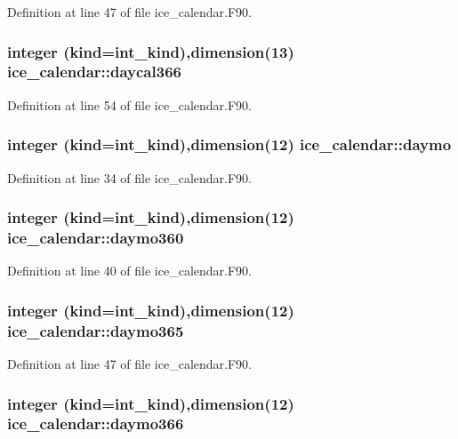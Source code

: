 Definition at line 47 of file ice\_\-calendar.F90.\hypertarget{namespaceice__calendar_a19cae1dafbfb758fdfe8ee3378a033ef}{
\subsubsection[{daycal366}]{\setlength{\rightskip}{0pt plus 5cm}integer (kind=int\_\-kind),dimension(13) {\bf ice\_\-calendar::daycal366}}}
\label{namespaceice__calendar_a19cae1dafbfb758fdfe8ee3378a033ef}


Definition at line 54 of file ice\_\-calendar.F90.\hypertarget{namespaceice__calendar_a1d4afbbddfef91146892cd47f6734b77}{
\subsubsection[{daymo}]{\setlength{\rightskip}{0pt plus 5cm}integer (kind=int\_\-kind),dimension(12) {\bf ice\_\-calendar::daymo}}}
\label{namespaceice__calendar_a1d4afbbddfef91146892cd47f6734b77}


Definition at line 34 of file ice\_\-calendar.F90.\hypertarget{namespaceice__calendar_aa23a9d5a11d0cd15e84d3b9771338ad5}{
\subsubsection[{daymo360}]{\setlength{\rightskip}{0pt plus 5cm}integer (kind=int\_\-kind),dimension(12) {\bf ice\_\-calendar::daymo360}}}
\label{namespaceice__calendar_aa23a9d5a11d0cd15e84d3b9771338ad5}


Definition at line 40 of file ice\_\-calendar.F90.\hypertarget{namespaceice__calendar_abd42cdcd4849fa25afe07f9e672c677e}{
\subsubsection[{daymo365}]{\setlength{\rightskip}{0pt plus 5cm}integer (kind=int\_\-kind),dimension(12) {\bf ice\_\-calendar::daymo365}}}
\label{namespaceice__calendar_abd42cdcd4849fa25afe07f9e672c677e}


Definition at line 47 of file ice\_\-calendar.F90.\hypertarget{namespaceice__calendar_a5db58762f256066e2e55974bc51b0b1e}{
\subsubsection[{daymo366}]{\setlength{\rightskip}{0pt plus 5cm}integer (kind=int\_\-kind),dimension(12) {\bf ice\_\-calendar::daymo366}}}
\label{namespaceice__calendar_a5db58762f256066e2e55974bc51b0b1e}


